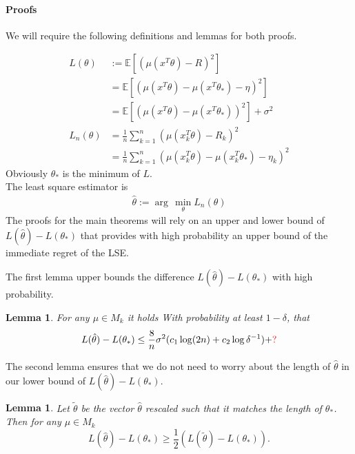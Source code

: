 \documentclass[twoside]{article} \usepackage{aistats2017}
\newcommand{\EV}[1] {
  \mathbb{E}\left[#1\right]}
\newtheorem{lemma}[theorem]{Lemma}
\begin{document}
\paragraph{Proofs} We will require the following definitions and lemmas for both proofs.

\begin{align*}
    L(\theta) &:= \EV{(\mu(x^T\theta)-R)^2}\nonumber\\
    &= \EV{(\mu(x^T\theta)-\mu(x^T\theta_*)-\eta)^2}\\
    &=\EV{(\mu(x^T\theta)-\mu(x^T\theta_*))^2}+\sigma^2\\
    L_n(\theta) &= \frac{1}{n}\sum_{k=1}^n(\mu(x_k^T\theta)-R_k)^2\\
    &= \frac{1}{n}\sum_{k=1}^n(\mu(x_k^T\theta)-\mu(x_k^T\theta_*)-\eta_k)^2
\end{align*}
Obviously $\theta_*$ is the minimum of $L$.\\
The least square estimator is
\begin{align}
    \hat{\theta} := \arg\,\min_{\theta} L_n(\theta)
\end{align}
The proofs for the main theorems will rely on an upper and lower bound of $L(\hat{\theta})-L(\theta_*)$ that provides with high probability an upper bound of the immediate regret of the LSE.

The first lemma upper bounds the difference $L(\hat{\theta})-L(\theta_*)$ with high probability.
\begin{lemma}
    For any $\mu\in M_k$ it holds With probability at least $1-\delta$, that 
    \begin{align}
    L(\hat{\theta})-L(\theta_*)\leq \frac{8}{n}\sigma^2(c_1\log(2n)+c_2\log{\delta^{-1}})+\color{red}?\color{black}
    \end{align}
\end{lemma}
The second lemma ensures that we do not need to worry about the length of $\hat{\theta}$ in our lower bound of $L(\hat{\theta})-L(\theta_*)$.
\begin{lemma}
    Let $\tilde{\theta}$ be the vector $\hat{\theta}$ rescaled such that it matches the length of $\theta_*$. Then for any $\mu\in M_k$
    $$L(\hat{\theta})-L(\theta_*) \geq \frac{1}{2}(L(\tilde{\theta})-L(\theta_*)).$$
\end{lemma}
\end{document}
